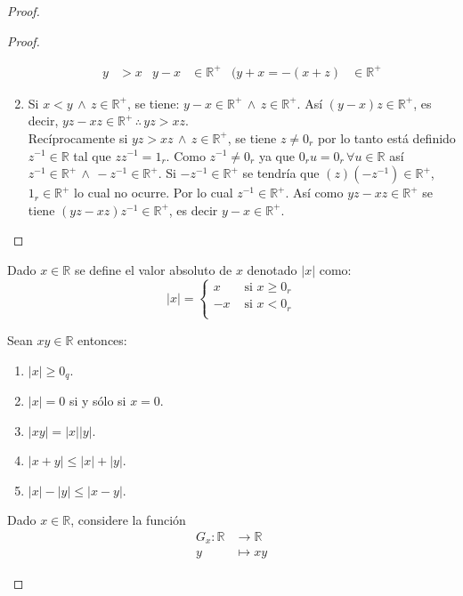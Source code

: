 \begin{proof}
\begin{proof}
\begin{enumerate}
\begin{align*}
        y&>x & y-x &\in \mathbb{R}^+ & (y+x=-(x+z) &\in \mathbb{R}^+
      \end{align*}
    \item Si $x<y \, \land \, z \in \mathbb{R}^+$, se tiene: $y-x \in
      \mathbb{R}^+ \, \land \, z \in \mathbb{R}^+$. Así $(y-x)z \in
      \mathbb{R}^+$, es decir, $yz-xz \in \mathbb{R}^+ \, \therefore \, yz >
      xz$. \\
      Recíprocamente si $yz > xz \, \land \, z \in \mathbb{R}^+$, se tiene $z
      \neq 0_r$ por lo tanto está definido $z^{-1} \in \mathbb{R}$ tal que
      $zz^{-1} = 1_r$. Como $z^{-1} \neq 0_r$ ya que $0_r u = 0_r \, \forall u
      \in \mathbb{R}$ así $z^{-1} \in \mathbb{R}^+ \, \land \, -z^{-1} \in
      \mathbb{R}^+$. Si $-z^{-1} \in \mathbb{R}^+$ se tendría que $(z)(-z^{-1})
      \in \mathbb{R}^+$, $1_r \in \mathbb{R}^+$ lo cual no ocurre. Por lo cual
      $z^{-1} \in \mathbb{R}^+$. Así como $yz-xz \in \mathbb{R}^+$ se tiene 
      $(yz- xz)z^{-1} \in \mathbb{R^+}$, es decir $y-x \in \mathbb{R}^+$.
  \end{enumerate}
\end{proof}
\begin{definition}
  Dado $x \in \mathbb{R}$ se define el valor absoluto de $x$ denotado $|x|$
  como:
  \[
    |x| = 
    \begin{cases}
      x &\mbox{ si } x \geq 0_r \\
      -x &\mbox{ si } x < 0_r \\
    \end{cases}
  \]
\end{definition}
\begin{proposition}\label{prop:53}
  Sean $xy \in \mathbb{R}$ entonces:
  \begin{enumerate}
    \item $|x| \geq 0_q$.
    \item $|x| = 0$ si y sólo si $x = 0$.
    \item $|xy| = |x||y|$.
    \item $|x + y| \leq |x| + |y|$.
    \item $|x|-|y| \leq |x-y|$.
  \end{enumerate} 
\end{proposition} 
Dado $x \in \mathbb{R}$, considere la función
\begin{align*}
  G_x : \mathbb{R} &\to \mathbb{R} \\
  y &\mapsto xy
\end{align*}
\begin{definition}

\end{definition}
\end{proof}
